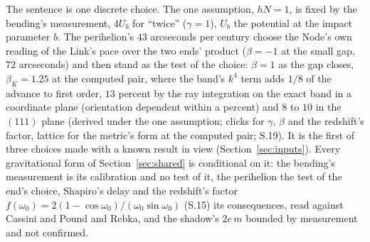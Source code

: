 \documentclass[pdflatex,sn-mathphys-num]{sn-jnl}
\theoremstyle{thmstyleone}
\theoremstyle{thmstyletwo}
\begin{document}
The sentence is one discrete choice. The one assumption, $hN = 1$, is fixed by the bending's measurement, $4U_b$ for ``twice'' ($\gamma = 1$), $U_b$ the potential at the impact parameter $b$. The perihelion's $43$ arcseconds per century \cite{will} choose the Node's own reading of the Link's pace over the two ends' product ($\beta = -1$ at the small gap, $72$ arcseconds) and then stand as the test of the choice: $\beta = 1$ as the gap closes, $\beta_K = 1.25$ at the computed pair, where the band's $k^4$ term adds $1 / 8$ of the advance to first order, $13$ percent by the ray integration on the exact band in a coordinate plane (orientation dependent within a percent) and $8$ to $10$ in the $(111)$ plane (derived under the one assumption; clicks for $\gamma$, $\beta$ and the redshift's factor, lattice for the metric's form at the computed pair; S.19). It is the first of three choices made with a known result in view (Section~\ref{sec:inputs}). Every gravitational form of Section~\ref{sec:shared} is conditional on it: the bending's measurement is its calibration and no test of it, the perihelion the test of the end's choice, Shapiro's delay and the redshift's factor $f(\omega_0) = 2(1 - \cos\omega_0) / (\omega_0\sin\omega_0)$ (S.15) its consequences, read against Cassini and Pound and Rebka, and the shadow's $2e\,m$ bounded by measurement and not confirmed.
\end{document}
